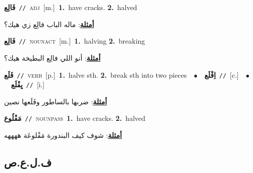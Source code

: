 \documentclass[10pt,a4paper,twoside]{article} %
\begin{document}
\begin{multicols}{2}
{\setlength\topsep{0pt}\textbf{\foreignlanguage{arabic}{فَالِع}}\ {\color{gray}\texttt{//}\color{black}}\ \textsc{adj}\ [m.]\ \textbf{1.}~have cracks.  \textbf{2.}~halved\  \begin{flushright}\color{gray}\foreignlanguage{arabic}{\textbf{\underline{\foreignlanguage{arabic}{أمثلة}}}: ماله الباب فالِع زي هيك؟}\end{flushright}\color{black}} \vspace{2mm}

{\setlength\topsep{0pt}\textbf{\foreignlanguage{arabic}{فَالِع}}\ {\color{gray}\texttt{//}\color{black}}\ \textsc{noun\textunderscore act}\ [m.]\ \textbf{1.}~halving  \textbf{2.}~breaking\  \begin{flushright}\color{gray}\foreignlanguage{arabic}{\textbf{\underline{\foreignlanguage{arabic}{أمثلة}}}: أنو اللي فالِع البطيخة هيك؟}\end{flushright}\color{black}} \vspace{2mm}

{\setlength\topsep{0pt}\textbf{\foreignlanguage{arabic}{فَلَع}}\ {\color{gray}\texttt{//}\color{black}}\ \textsc{verb}\ [p.]\ \textbf{1.}~halve sth.  \textbf{2.}~break sth into two pieces\ \ $\bullet$\ \ \setlength\topsep{0pt}\textbf{\foreignlanguage{arabic}{اِفْلَع}}\ {\color{gray}\texttt{//}\color{black}}\ [c.]\ \ $\bullet$\ \ \setlength\topsep{0pt}\textbf{\foreignlanguage{arabic}{يِفْلَع}}\ {\color{gray}\texttt{//}\color{black}}\ [i.]\  \begin{flushright}\color{gray}\foreignlanguage{arabic}{\textbf{\underline{\foreignlanguage{arabic}{أمثلة}}}: ضربها بالساطور وفَلَعها نصين}\end{flushright}\color{black}} \vspace{2mm}

{\setlength\topsep{0pt}\textbf{\foreignlanguage{arabic}{مَفْلُوع}}\ {\color{gray}\texttt{//}\color{black}}\ \textsc{noun\textunderscore pass}\ \textbf{1.}~have cracks.  \textbf{2.}~halved\  \begin{flushright}\color{gray}\foreignlanguage{arabic}{\textbf{\underline{\foreignlanguage{arabic}{أمثلة}}}: شوف كيف البندورة مَفْلوعَة ههههه}\end{flushright}\color{black}} \vspace{2mm}

\vspace{-3mm}
\subsection*{\color{blue}\foreignlanguage{arabic}{ف.ل.ع.ص}\color{blue}{}} 


\end{multicols}
\end{document}
